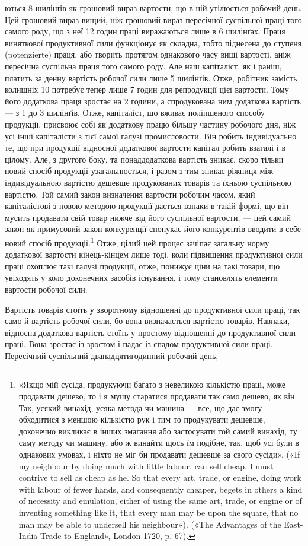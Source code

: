 ються 8 шилінґів як грошовий вираз вартости, що в ній утілюється робочий день. Цей грошовий вираз
вищий, ніж грошовий
вираз пересічної суспільної праці того самого роду, що з неї
12 годин праці виражаються лише в 6 шилінґах. Праця виняткової продуктивної сили функціонує як
складна, тобто піднесена
до ступеня (potenzierte) праця, або творить протягом однакового
часу вищі вартості, аніж пересічна суспільна праця того самого
роду. Але наш капіталіст, як і раніш, платить за денну вартість
робочої сили лише 5 шилінґів. Отже, робітник замість колишніх
10 потребує тепер лише 7 годин для репродукції цієї вартости.
Тому його додаткова праця зростає на 2 години, а спродукована
ним додаткова вартість — з 1 до 3 шилінґів. Отже, капіталіст,
що вживає поліпшеного способу продукції, присвоює собі як додаткову працю більшу частину робочого
дня, ніж усі інші капіталісти
з тієї самої галузі промисловости. Він робить індивідуально те,
що при продукції відносної додаткової вартости капітал робить
взагалі і в цілому. Але, з другого боку, та понаддодаткова вартість
зникає, скоро тільки новий спосіб продукції узагальнюється, і
разом з тим зникає ріжниця між індивідуальною вартістю дешевше
продукованих товарів та їхньою суспільною вартістю. Той самий
закон визначення вартости робочим часом, який капіталістові
з новою методою продукції дається взнаки в такій формі, що він
мусить продавати свій товар нижче від його суспільної вартости, — цей самий закон як примусовий
закон конкуренції спонукає його конкурентів вводити в себе новий спосіб продукції.\footnote{
«Якщо мій сусіда, продукуючи багато з невеликою кількістю праці,
може продавати дешево, то і я мушу старатися продавати так само дешево,
як він. Так, усякий винахід, усяка метода чи машина — все, що дає змогу
обходитися з меншою кількістю рук і тим то продукувати дешевше, доконечно викликає в інших змагання
або застосувати той самий винахід,
ту саму методу чи машину, або ж винайти щось їм подібне, так, щоб
усі були в однакових умовах, і ніхто не міг би продавати дешевше за свого
сусіди». («If my neighbour by doing much with little labour, can sell
cheap, I must contrive to sell as cheap as he. So that every art, trade, or
engine, doing work with labour of fewer hands, and consequently cheaper,
begets in others a kind of necessity and emulation, either of using the same
art, trade, or engine or of inventing something like it, that every man
may be upon the square, that no man may be able to undersell his neighbour»). («The Advantages of
the East-India Trade to England», London
1720, p. 67).
}
Отже, цілий цей процес зачіпає загальну норму додаткової вартости кінець-кінцем лише тоді, коли
підвищення продуктивної
сили праці охоплює такі галузі продукції, отже, понижує ціни
на такі товари, що увіходять у коло доконечних засобів існування,
і тому становлять елементи вартости робочої сили.

Вартість товарів стоїть у зворотному відношенні до продуктивної сили праці, так само й вартість
робочої сили, бо вона
визначається вартістю товарів. Навпаки, відносна додаткова
вартість стоїть у простому відношенні до продуктивної сили праці.
Вона зростає із зростом і падає із спадом продуктивної сили праці.
Пересічний суспільний дванадцятигодинний робочий день, —